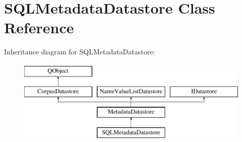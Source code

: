 \hypertarget{class_s_q_l_metadata_datastore}{}\section{S\+Q\+L\+Metadata\+Datastore Class Reference}
\label{class_s_q_l_metadata_datastore}
Inheritance diagram for S\+Q\+L\+Metadata\+Datastore\+:\begin{figure}[H]
\begin{center}
\leavevmode
\includegraphics[height=4.000000cm]{class_s_q_l_metadata_datastore}
\end{center}
\end{figure}
